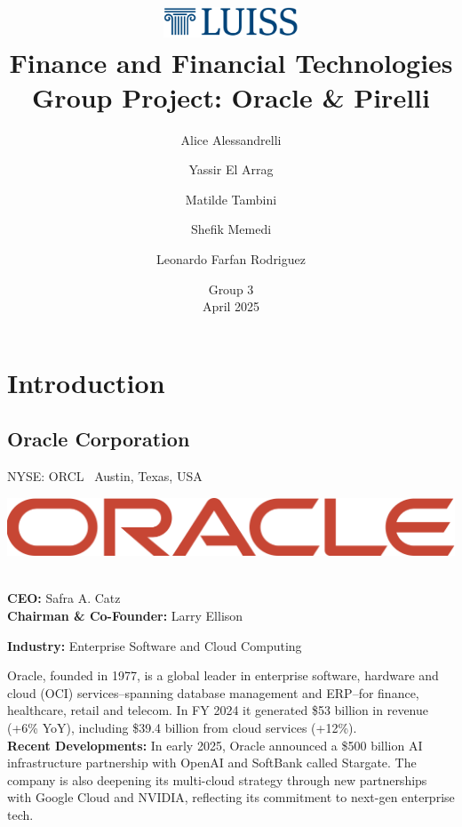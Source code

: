 \documentclass[12pt,a4paper]{report}
\title{
  \vspace{-2em}
  \includegraphics[width=4cm]{luiss.png}\\[1.5em]
  {\LARGE Finance and Financial Technologies}\\[0.5em]
  {\large Group Project: Oracle \& Pirelli}
}
\author{Alice Alessandrelli \and Yassir El Arrag \and Matilde Tambini \and Shefik Memedi \and Leonardo Farfan Rodriguez}
\date{Group 3\\April 2025}
\begin{document}
\maketitle
{}
\tableofcontents
\clearpage

\setcounter{page}{1}

\chapter{Introduction}
\noindent
\begin{minipage}[t]{0.65\textwidth}
\section*{Oracle Corporation}
NYSE: ORCL \textbar\ Austin, Texas, USA
\end{minipage}%
\hfill
\begin{minipage}[t]{0.30\textwidth}
  \vspace{-12pt}
  \includegraphics[width=\linewidth]{oracle.png}
\end{minipage}\\

\textbf{CEO:} Safra A. Catz \\
\textbf{Chairman \& Co-Founder:} Larry Ellison

\textbf{Industry:} Enterprise Software and Cloud Computing

Oracle, founded in 1977, is a global leader in enterprise software, hardware and cloud (OCI) services--spanning database management and ERP--for finance, healthcare, retail and telecom. In FY 2024 it generated \$53 billion in revenue (+6\% YoY), including \$39.4 billion from cloud services (+12\%).\\

\textbf{Recent Developments:} In early 2025, Oracle announced a \$500 billion AI infrastructure partnership with OpenAI and SoftBank called Stargate. The company is also deepening its multi-cloud strategy through new partnerships with Google Cloud and NVIDIA, reflecting its commitment to next-gen enterprise tech.\\
\end{document}
